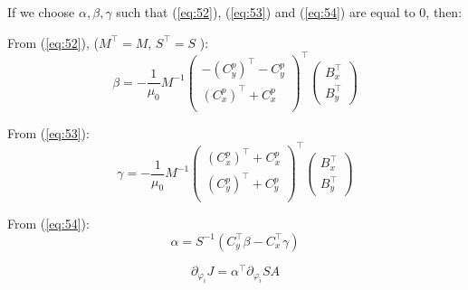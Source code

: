 \noindent If we choose $\alpha, \beta, \gamma$ such that  (\ref{eq:52}), (\ref{eq:53}) and (\ref{eq:54}) are equal to $0$, then: 

\noindent From (\ref{eq:52}), ($M^{\top} = M$, $S^{\top} = S$ ): 
\begin{equation} \label{eq:56} 
\beta = - \frac{1}{\mu_0} M^{-1} \begin{pmatrix} -\left(C_y^p\right)^{\top} -C_y^p \\ \left(C_x^p\right)^{\top} + C_x^p \\ \end{pmatrix}^{\top} \begin{pmatrix} B_x^{\top} \\ B_y^{\top}  \end{pmatrix}
\end{equation}

\noindent From (\ref{eq:53}): 
\begin{equation} \label{eq:57} 
\gamma = - \frac{1}{\mu_0} M^{-1} \begin{pmatrix} \left(C_x^p\right)^{\top} + C_x^p \\ \left(C_y^p\right)^{\top} + C_y^p \\ \end{pmatrix}^{\top} \begin{pmatrix} B_x^{\top} \\ B_y^{\top}  \end{pmatrix}
\end{equation}

\noindent From (\ref{eq:54}): 
\begin{equation} \label{eq:58} 
\alpha =  S^{-1} \left( C_y^{\top} \beta - C_x^{\top} \gamma \right)
\end{equation}


\begin{equation} \label{eq:59} 
\partial_{\varphi_i} J = \alpha^{\top} \partial_{\varphi_i} S A 
\end{equation}

